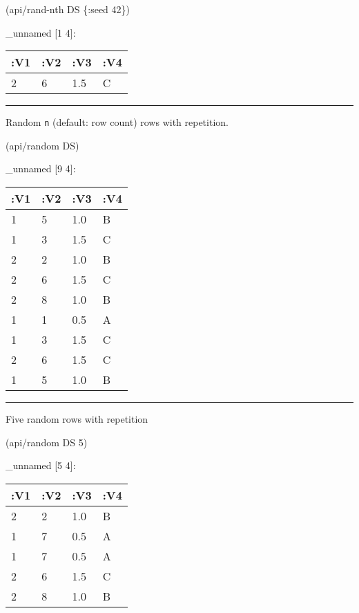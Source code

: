 \documentclass[]{article}
\newenvironment{Shaded}{\begin{snugshade}}{\end{snugshade}}
\newcommand{\AttributeTok}[1]{\textcolor[rgb]{0.77,0.63,0.00}{#1}}
\newcommand{\DecValTok}[1]{\textcolor[rgb]{0.00,0.00,0.81}{#1}}
\newcommand{\NormalTok}[1]{#1}
\begin{document}
\begin{Shaded}
\begin{Highlighting}[]
\NormalTok{(api/rand-nth DS \{}\AttributeTok{:seed} \DecValTok{42}\NormalTok{\})}
\end{Highlighting}
\end{Shaded}

\_unnamed {[}1 4{]}:

\begin{longtable}[]{@{}llll@{}}
\toprule
:V1 & :V2 & :V3 & :V4\tabularnewline
\midrule
\endhead
2 & 6 & 1.5 & C\tabularnewline
\bottomrule
\end{longtable}

\begin{center}\rule{0.5\linewidth}{0.5pt}\end{center}

Random \texttt{n} (default: row count) rows with repetition.

\begin{Shaded}
\begin{Highlighting}[]
\NormalTok{(api/random DS)}
\end{Highlighting}
\end{Shaded}

\_unnamed {[}9 4{]}:

\begin{longtable}[]{@{}llll@{}}
\toprule
:V1 & :V2 & :V3 & :V4\tabularnewline
\midrule
\endhead
1 & 5 & 1.0 & B\tabularnewline
1 & 3 & 1.5 & C\tabularnewline
2 & 2 & 1.0 & B\tabularnewline
2 & 6 & 1.5 & C\tabularnewline
2 & 8 & 1.0 & B\tabularnewline
1 & 1 & 0.5 & A\tabularnewline
1 & 3 & 1.5 & C\tabularnewline
2 & 6 & 1.5 & C\tabularnewline
1 & 5 & 1.0 & B\tabularnewline
\bottomrule
\end{longtable}

\begin{center}\rule{0.5\linewidth}{0.5pt}\end{center}

Five random rows with repetition

\begin{Shaded}
\begin{Highlighting}[]
\NormalTok{(api/random DS }\DecValTok{5}\NormalTok{)}
\end{Highlighting}
\end{Shaded}

\_unnamed {[}5 4{]}:

\begin{longtable}[]{@{}llll@{}}
\toprule
:V1 & :V2 & :V3 & :V4\tabularnewline
\midrule
\endhead
2 & 2 & 1.0 & B\tabularnewline
1 & 7 & 0.5 & A\tabularnewline
1 & 7 & 0.5 & A\tabularnewline
2 & 6 & 1.5 & C\tabularnewline
2 & 8 & 1.0 & B\tabularnewline
\bottomrule
\end{longtable}
\end{document}
